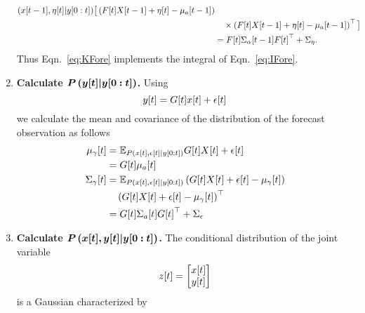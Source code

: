 \begin{enumerate}
\begin{align}
{       \left({x}{[t-1]},{\eta}{[t]}|y[0:t] \right)} \big[
     \left( {F}{[t]}{X}{[t-1]} + {\eta}{[t]} - {\mu_a}{[t-1]}
     \right) \nonumber\\
     & \quad \times \left( {F}{[t]}{X}{[t-1]} + {\eta}{[t]} -
       {\mu_a}{[t-1]} \right)^\top \big] \\
    &= {F}{[t]}{\Sigma_\alpha}{[t-1]}{F}{[t]}^\top +
    \Sigma_\eta .
  \end{align}
  Thus Eqn.~\eqref{eq:KFore} implements the integral of
  Eqn.~\eqref{eq:IFore}.
\item \label{PYforecast} \textbf{Calculate
    $\bm{P\left({y}{[t]}|y[0:t] \right)}$.}  Using
  \begin{equation*}
    {y}{[t]} = {G}{[t]}{x}{[t]} + {\epsilon}{[t]}
  \end{equation*}
  we calculate the mean and covariance of the distribution of the
  forecast observation as follows
  \begin{align}
    {\mu_\gamma}{[t]} &= \mathbb{E}_{P
      \left({x}{[t]},{\epsilon}{[t]}|y[0:t] \right)}
    {G}{[t]}{X}{[t]} + {\epsilon}{[t]} \nonumber \\
    \label{eq:mugamma}
    &= {G}{[t]}{\mu_a}{[t]}\\
    {\Sigma_\gamma}{[t]} &= \mathbb{E}_{P
      \left({x}{[t]},{\epsilon}{[t]}|y[0:t] \right)}
    \left( {G}{[t]}{X}{[t]} + {\epsilon}{[t]} -
      {\mu_\gamma}{[t]} \right) \nonumber \\
    &\quad\left( {G}{[t]}{X}{[t]} +
      {\epsilon}{[t]} - {\mu_\gamma}{[t]}
    \right)^\top \nonumber \\
    \label{eq:Sigmagamma}
    &= {G}{[t]}{\Sigma_a}{[t]}{G}{[t]}^\top +
    \Sigma_\epsilon
  \end{align}
\item \label{PZforecast} \textbf{Calculate $\bm{P\left({x}{[t]},
        {y}{[t]}|y[0:t] \right)}$.}  The conditional
  distribution of the joint variable
  \begin{equation*}
    {z}{[t]} =
    \begin{bmatrix}
      {x}{[t]}\\
      {y}{[t]}
    \end{bmatrix}
  \end{equation*}
  is a Gaussian characterized by
  \begin{equation*}

\end{equation*}
\end{enumerate}
